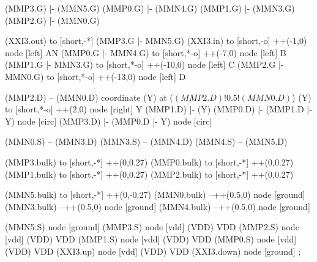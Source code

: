 \begin{circuitikz}[american]

	(MMP3.G) |- (MMN5.G)
	(MMP0.G) |- (MMN4.G)
	(MMP1.G) |- (MMN3.G)
	(MMP2.G) |- (MMN0.G)
	
	(XXI3.out) to [short,-*] (MMP3.G |- MMN5.G)
	(XXI3.in) to [short,-o] ++(-1,0) node [left] {AN}
	(MMP0.G |- MMN4.G) to [short,*-o] ++(-7,0) node [left] {B}
	(MMP1.G |- MMN3.G) to [short,*-o] ++(-10,0) node [left] {C}  
	(MMP2.G |- MMN0.G) to [short,*-o] ++(-13,0) node [left] {D}
	
	(MMP2.D) -- (MMN0.D)
	coordinate (Y) at ($(MMP2.D)!0.5!(MMN0.D)$)
	(Y) to [short,*-o] ++(2,0) node [right] {Y}
	(MMP1.D) |- (Y)
	(MMP0.D) |- (MMP1.D |- Y) node [circ] {}
	(MMP3.D) |- (MMP0.D |- Y) node [circ] {}
	
	(MMN0.S) -- (MMN3.D)
	(MMN3.S) -- (MMN4.D)
	(MMN4.S) -- (MMN5.D)
	
	(MMP3.bulk) to [short,-*] ++(0,0.27)
	(MMP0.bulk) to [short,-*] ++(0,0.27)
	(MMP1.bulk) to [short,-*] ++(0,0.27)
	(MMP2.bulk) to [short,-*] ++(0,0.27)
	
	(MMN5.bulk) to [short,-*] ++(0,-0.27)
	(MMN0.bulk) --++(0.5,0) node [ground] {}
	(MMN3.bulk) --++(0.5,0) node [ground] {}
	(MMN4.bulk) --++(0.5,0) node [ground] {}
	

	(MMN5.S) node [ground] {}
	(MMP3.S) node [vdd] (VDD) {VDD}
	(MMP2.S) node [vdd] (VDD) {VDD}
	(MMP1.S) node [vdd] (VDD) {VDD}
	(MMP0.S) node [vdd] (VDD) {VDD}
	(XXI3.up) node [vdd] (VDD) {VDD}
	(XXI3.down) node [ground] {}
;

\end{circuitikz}
